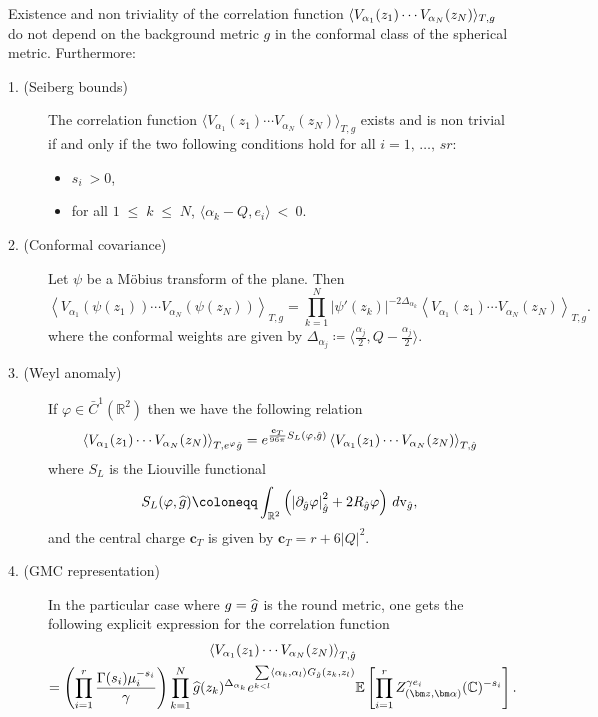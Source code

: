 \documentclass[AHL,Unicode,longabstracts,published]{cedram}
\renewcommand{\leq}{\;\leqslant\;}
\newcommand{\rmv}{\mathrm{v}}
\newcommand{\C}{\mathbb{C}}
\newcommand{\R}{\mathbb{R}}
\newcommand{\E}{\mathbb{E}}
\newcommand{\bfc}{\mathbf{c}}
\newcommand{\ps}[1]{\langle #1 \rangle}
\let\oldhat\hat
\renewcommand*{\hat}[1]{\mathchoice{\widehat{#1}}{\widehat{#1}}{\oldhat{#1}}{\oldhat{#1}}}
\begin{document}
\begin{theo}\label{propcorrel1}
Existence and non triviality of the correlation function $ \langle V_{\alpha_1}(z_1)\linebreak \cdots V_{\alpha_N}(z_N) \rangle_{T,g} $ do not depend on the background metric $g$ in the conformal class of the spherical metric. Furthermore:
\begin{description}
\item[1. (Seiberg bounds)] The correlation function $ \langle V_{\alpha_1}(z_1) \cdots V_{\alpha_N}(z_N) \rangle_{T,g} $ exists and is non trivial if and only if the two following conditions hold for all $i=1,\,\dots,\,sr$:
\begin{itemize}
\item $s_i \: >0$,
\item for all $1\leq k\leq N$, $\langle\alpha_k-Q, e_i \rangle \: < \: 0$.
\end{itemize}
\item[2. (Conformal covariance)\label{item2}] Let $\psi$ be a M\"obius transform of the plane. Then
\begin{equation*}
\left\langle V_{\alpha_1}(\psi (z_1)) \cdots V_{\alpha_N}(\psi (z_N)) \right\rangle_{T,g}= \prod_{k=1}^N\left|\psi'(z_k)\right|^{-2\Delta_{\alpha_k}}\left\langle V_{\alpha_1}(z_1) \cdots V_{\alpha_N}(z_N)\right\rangle_{T,g}.
\end{equation*}
where the conformal weights are given by $\Delta_{\alpha_j}\coloneqq \ps{ \frac{\alpha_j}2, Q-\frac{\alpha_j}{2}}$.
\item[3. (Weyl anomaly)\label{item3}] If $\varphi\in\bar{C}^1(\R^2)$ then we have the following relation
\begin{equation*}
\left\langle V_{\alpha_1}(z_1) \cdots V_{\alpha_N}(z_N)\right\rangle_{T,e^\varphi \hat g} =e^{ \frac{\bfc_T}{96 \pi}S_L(\varphi,\hat g) } \left\langle V_{\alpha_1}(z_1) \cdots V_{\alpha_N}(z_N) \right\rangle_{T,\hat{g}}
\end{equation*}
where $S_L$ is the Liouville functional
\[
S_L(\varphi,\hat g)\coloneqq \int_{\R^2}\left(\left|\partial_{\hat{g}} \varphi\right|^2_{\hat{g}} + 2 R_{\hat{g}} \varphi \right) \,d\rmv_{\hat{g}},
\]
and the central charge $\bfc_T$ is given by $\bfc_T= r + 6 |Q|^2 $.
\item[4. (GMC representation)] In the particular case where $g=\hat{g}$ is the round metric, one gets the following explicit expression for the correlation function
\begin{multline}\label{expressioncorrels}
\left\langle V_{\alpha_1}(z_1) \cdots V_{\alpha_N}(z_N) \right\rangle_{T,\hat g} \\
= \left (\prod_{i=1}^{r} \frac{\Gamma (s_i)\mu_i^{- s_i}}\gamma \right)\prod_{k=1}^N \hat g (z_k)^{\Delta_{\alpha_k}} e^{ \sum\limits_{ k < l} \langle\alpha_k,\alpha_l \rangle G_{\hat g}(z_k,z_l) } \E \left [\prod_{i=1}^{r} Z_{(\bm z,\bm \alpha)}^{\gamma e_i} (\C)^{- s_i} \right].
\end{multline}
\end{description}
\end{theo}
\end{document}
